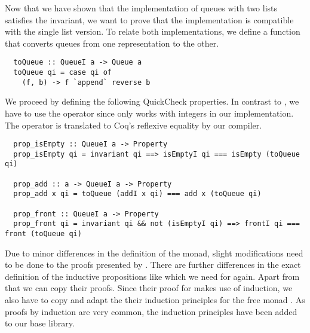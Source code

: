 Now that we have shown that the implementation of queues with two lists satisfies the invariant, we want to prove that the implementation is compatible with the single list version.
To relate both implementations, we define a function that converts queues from one representation to the other.
\begin{verbatim}
  toQueue :: QueueI a -> Queue a
  toQueue qi = case qi of
    (f, b) -> f `append` reverse b
\end{verbatim}
We proceed by defining the following QuickCheck properties.
In contrast to \cite{Dylus:2018}, we have to use the \haskell{(===)} operator since \haskell{(==)} only works with integers in our implementation.
The \haskell{(===)} operator is translated to Coq's reflexive equality by our compiler.
\begin{verbatim}
  prop_isEmpty :: QueueI a -> Property
  prop_isEmpty qi = invariant qi ==> isEmptyI qi === isEmpty (toQueue qi)

  prop_add :: a -> QueueI a -> Property
  prop_add x qi = toQueue (addI x qi) === add x (toQueue qi)

  prop_front :: QueueI a -> Property
  prop_front qi = invariant qi && not (isEmptyI qi) ==> frontI qi === front (toQueue qi)
\end{verbatim}
Due to minor differences in the definition of the  monad, slight modifications need to be done to the proofs presented by \cite{Dylus:2018}.
There are further differences in the exact definition of the inductive propositions like  which we need for  again.
Apart from that we can copy their proofs.
Since their proof for \coq{} makes use of induction, we also have to copy and adapt the their induction principles for the free monad \cite[pp.~29-31]{Dylus:2018}.
As proofs by induction are very common, the induction principles have been added to our base library.

